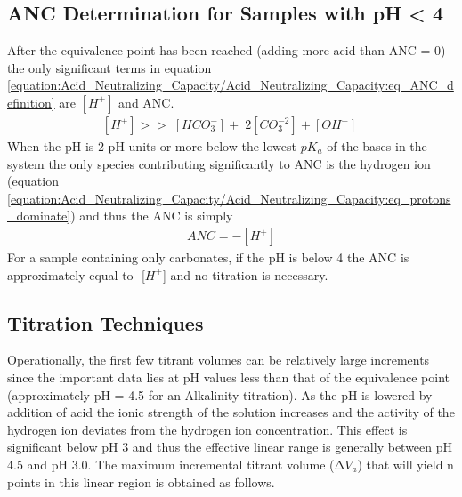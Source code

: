 \documentclass[letterpaper,10pt,english]{sphinxmanual}
\begin{document}
\subsection{ANC Determination for Samples with pH \textless{} 4}
\label{\detokenize{Acid_Neutralizing_Capacity/Acid_Neutralizing_Capacity:anc-determination-for-samples-with-ph-4}}
After the equivalence point has been reached (adding more acid than ANC = 0) the only significant terms in equation \eqref{equation:Acid_Neutralizing_Capacity/Acid_Neutralizing_Capacity:eq_ANC_definition} are \(\left[{H}^{+} \right]\) and ANC.
\begin{equation}\label{equation:Acid_Neutralizing_Capacity/Acid_Neutralizing_Capacity:eq_protons_dominate}
\begin{split} \left[{H}^{+} \right]>>{\; }\left[{HCO}_{{3}}^{{-}} \right]+{\; 2}\left[{CO}_{{3}}^{{-2}} \right]+\left[{OH}^{{-}} \right]{\; }\end{split}
\end{equation}
When the pH is 2 pH units or more below the lowest \(pK_a\) of the bases in the system the only species contributing significantly to ANC is the hydrogen ion (equation \eqref{equation:Acid_Neutralizing_Capacity/Acid_Neutralizing_Capacity:eq_protons_dominate}) and thus the ANC is simply
\begin{equation}\label{equation:Acid_Neutralizing_Capacity/Acid_Neutralizing_Capacity:eq_Gran_pH_lt4}
\begin{split} ANC= - [H^+]\end{split}
\end{equation}
For a sample containing only carbonates, if the pH is below 4 the ANC is approximately equal to -{[}\(H^+\){]} and no titration is necessary.


\subsection{Titration Techniques}
\label{\detokenize{Acid_Neutralizing_Capacity/Acid_Neutralizing_Capacity:titration-techniques}}\label{\detokenize{Acid_Neutralizing_Capacity/Acid_Neutralizing_Capacity:heading-anc-titration-techniques}}
Operationally, the first few titrant volumes can be relatively large increments since the important data lies at pH values less than that of the equivalence point (approximately pH = 4.5 for an Alkalinity titration). As the pH is lowered by addition of acid the ionic strength of the solution increases and the activity of the hydrogen ion deviates from the hydrogen ion concentration. This effect is significant below pH 3 and thus the effective linear range is generally between pH 4.5 and pH 3.0. The maximum incremental titrant volume (\(\mathrm{\Delta}V_a\)) that will yield n points in this linear region is obtained as follows.
\end{document}
